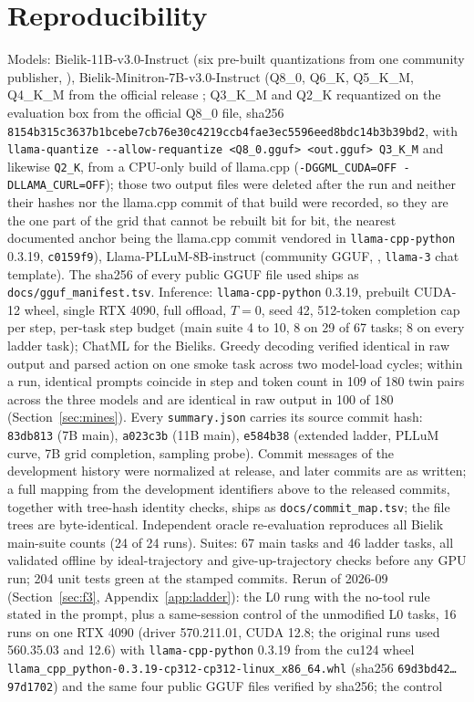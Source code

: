 \documentclass[11pt]{article}
\begin{document}
\section*{Reproducibility}
\begin{sloppypar}
Models: Bielik-11B-v3.0-Instruct (six pre-built quantizations from one community publisher, ), Bielik-Minitron-7B-v3.0-Instruct (Q8\_0, Q6\_K, Q5\_K\_M, Q4\_K\_M from the official release ; Q3\_K\_M and Q2\_K requantized on the evaluation box from the official Q8\_0 file, sha256 \texttt{8154b315c3637b1bcebe7cb76e30c4}\allowbreak\texttt{219ccb4fae3ec5596eed8bdc14b3b39bd2}, with \texttt{llama-quantize -{}-allow-requantize <Q8\_0.gguf> <out.gguf> Q3\_K\_M} and likewise \texttt{Q2\_K}, from a CPU-only build of llama.cpp (\texttt{-DGGML\_CUDA=OFF -DLLAMA\_CURL=OFF}); those two output files were deleted after the run and neither their hashes nor the llama.cpp commit of that build were recorded, so they are the one part of the grid that cannot be rebuilt bit for bit, the nearest documented anchor being the llama.cpp commit vendored in \texttt{llama-cpp-python} 0.3.19, \texttt{c0159f9}), Llama-PLLuM-8B-instruct (community GGUF, , \texttt{llama-3} chat template). The sha256 of every public GGUF file used ships as \texttt{docs/gguf\_manifest.tsv}. Inference: \texttt{llama-cpp-python} 0.3.19, prebuilt CUDA-12 wheel, single RTX 4090, full offload, $T=0$, seed 42, 512-token completion cap per step, per-task step budget (main suite 4 to 10, 8 on 29 of 67 tasks; 8 on every ladder task); ChatML for the Bieliks. Greedy decoding verified identical in raw output and parsed action on one smoke task across two model-load cycles; within a run, identical prompts coincide in step and token count in 109 of 180 twin pairs across the three models and are identical in raw output in 100 of 180 (Section~\ref{sec:mines}). Every \texttt{summary.json} carries its source commit hash: \texttt{83db813} (7B main), \texttt{a023c3b} (11B main), \texttt{e584b38} (extended ladder, PLLuM curve, 7B grid completion, sampling probe). Commit messages of the development history were normalized at release, and later commits are as written; a full mapping from the development identifiers above to the released commits, together with tree-hash identity checks, ships as \texttt{docs/commit\_map.tsv}; the file trees are byte-identical. Independent oracle re-evaluation reproduces all Bielik main-suite counts (24 of 24 runs). Suites: 67 main tasks and 46 ladder tasks, all validated offline by ideal-trajectory and give-up-trajectory checks before any GPU run; 204 unit tests green at the stamped commits. Rerun of 2026-09 (Section~\ref{sec:f3}, Appendix~\ref{app:ladder}): the L0 rung with the no-tool rule stated in the prompt, plus a same-session control of the unmodified L0 tasks, 16 runs on one RTX 4090 (driver 570.211.01, CUDA 12.8; the original runs used 560.35.03 and 12.6) with \texttt{llama-cpp-python} 0.3.19 from the cu124 wheel \texttt{llama\_cpp\_python-0.3.19-cp312-cp312-linux\_x86\_64.whl} (sha256 \texttt{69d3bd42\ldots97d1702}) and the same four public GGUF files verified by sha256; the control 
\end{sloppypar}
\end{document}

